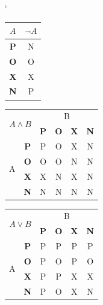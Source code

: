 \documentclass[11pt]{article}
\begin{document}
\begin{table}[ht]
    \catcode `
    \centering
    \begin{tabular}{|c|c|}\hline
         $A$        & $\neg A$   \\ \hline
         \textbf{P} & N          \\ \hline
         \textbf{O} & O          \\ \hline
         \textbf{X} & X          \\ \hline
         \textbf{N} & P          \\ \hline
    \end{tabular}
    \begin{tabular}{|c|c|c|c|c|c|}\hline
     \multicolumn{2}{|c|}{\multirow{2}{*}{$A \wedge B$}} & \multicolumn{4}{|c|}{B} \\ \cline{3-6}
     \multicolumn{2}{|c|}{}             & \textbf{P} & \textbf{O} & \textbf{X} & \textbf{N} \\ \hline
     \multirow{4}{*}{A}                 & \textbf{P} & P          &     O      & X          &  N \\\cline{2-6}
                                        & \textbf{O} & O          &     O      & N          &  N \\\cline{2-6}
                                        & \textbf{X} & X          &     N      & X          &  N \\\cline{2-6}
                                        & \textbf{N} & N          &     N      & N          &  N \\\hline
    \end{tabular}
     \begin{tabular}{|c|c|c|c|c|c|}\hline
     \multicolumn{2}{|c|}{\multirow{2}{*}{$A \vee B$}} & \multicolumn{4}{|c|}{B} \\ \cline{3-6}
     \multicolumn{2}{|c|}{}                                 & \textbf{P} & \textbf{O} & \textbf{X} & \textbf{N} \\ \hline
     \multirow{4}{*}{A}                 & \textbf{P} & P          &     P      & P          &  P \\\cline{2-6}
                                        & \textbf{O} & P          &     O      & P          &  O \\\cline{2-6}
                                        & \textbf{X} & P          &     P      & X          &  X \\\cline{2-6}
                                        & \textbf{N} & P          &     O      & X          &  N \\\hline

\end{tabular}
\end{table}
\end{document}
